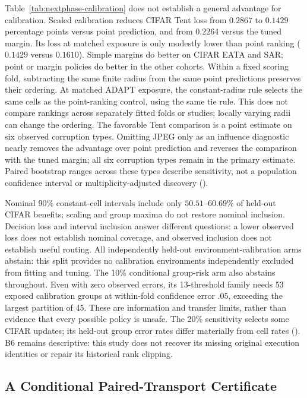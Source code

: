 Table~\ref{tab:nextphase-calibration} does not establish a general advantage for
calibration. Scaled calibration reduces CIFAR Tent loss from $0.2867$ to $0.1429$
percentage points versus point prediction, and from $0.2264$ versus the tuned
margin. Its loss at matched exposure is only modestly lower than point ranking
($0.1429$ versus $0.1610$). Simple margins do better on CIFAR EATA and SAR;
point or margin policies do better in the other cohorts. Within a fixed scoring fold,
subtracting the same finite radius from the same point predictions preserves their ordering.
At matched ADAPT exposure, the constant-radius rule selects the same cells as the
point-ranking control, using the same tie rule. This does not compare rankings across
separately fitted folds or studies; locally varying radii can change the ordering.
The favorable Tent comparison is a point estimate on six observed corruption types.
Omitting JPEG only as an influence diagnostic nearly removes the advantage over point
prediction and reverses the comparison with the tuned margin; all six corruption types
remain in the primary estimate. Paired bootstrap ranges across these types describe
sensitivity, not a population confidence interval or multiplicity-adjusted discovery
().

Nominal 90\% constant-cell intervals include only $50.51$--$60.69\%$ of held-out
CIFAR benefits; scaling and group maxima do not restore nominal inclusion. Decision loss and
interval inclusion answer different questions: a lower observed loss does not establish nominal
coverage, and observed inclusion does not establish useful routing.
All independently held-out environment-calibration arms abstain: this split
provides no calibration environments independently excluded from fitting and
tuning. The 10\% conditional group-risk arm also abstains throughout. Even with
zero observed errors, its 13-threshold family needs 53 exposed calibration groups
at within-fold confidence error $.05$, exceeding the largest partition of 45.
These are information and transfer limits, rather than evidence that every
possible policy is unsafe. The 20\% sensitivity selects some CIFAR updates;
its held-out group error rates differ materially from cell rates
().
B6 remains descriptive: this study does not recover its missing original execution
identities or repair its historical rank clipping.

\subsection{A Conditional Paired-Transport Certificate}
\label{sec:nextphase-paired}

